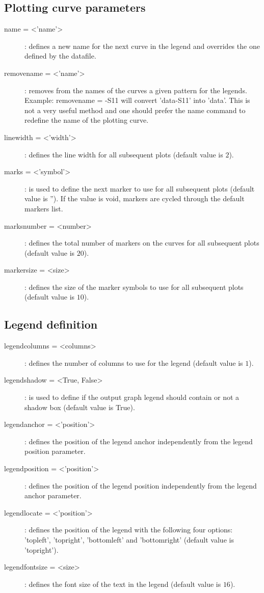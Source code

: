 \subsection{Plotting curve parameters}
\begin{description}
\item [name = <'name'>]: defines a new name for the next curve in the legend and overrides the one defined by the datafile.
\item [removename = <'name'>]: removes from the names of the curves a given pattern for the legends. Example: \textsf{removename} = -S11 will convert 'data-S11' into 'data'. This is not a very useful method and one should prefer the \textsf{name} command to redefine the name of the plotting curve.
\item [linewidth = <'width'>]: defines the line width for all subsequent plots (default value is $2$).
\item [marks = <'symbol'>]: is used to define the next marker to use for all subsequent plots (default value is ''). If the value is void, markers are cycled through the default markers list.
\item [marksnumber = <number>]: defines the total number of markers on the curves for all subsequent plots (default value is $20$).
\item [markersize = <size>]: defines the size of the marker symbols to use for all subsequent plots (default value is $10$).
\end{description}

\subsection{Legend definition}
\begin{description}
\item [legendcolumns = <columns>]: defines the number of columns to use for the legend (default value is $1$).
\item [legendshadow = <True, False>]: is used to define if the output graph legend should contain or not a shadow box (default value is True).
\item [legendanchor = <'position'>]: defines the position of the legend anchor independently from the legend position parameter.
\item [legendposition = <'position'>]: defines the position of the legend position independently from the legend anchor parameter.
\item [legendlocate = <'position'>]: defines the position of the legend with the following four options: 'topleft', 'topright', 'bottomleft' and 'bottomright' (default value is 'topright').
\item [legendfontsize = <size>]: defines the font size of the text in the legend (default value is $16$).
\end{description}

